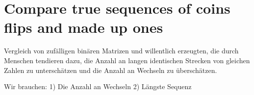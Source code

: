 
\renewenvironment{Schunk}{\vspace{10pt}}{\vspace{8pt}}   

\section{Compare true sequences of coins flips and made up ones}

Vergleich von zufälligen binären Matrizen und willentlich erzeugten, die durch 
Menschen tendieren dazu, die Anzahl an langen identischen Strecken von gleichen Zahlen zu unterschätzen und die Anzahl an Wechseln zu überschätzen. 
     
Wir brauchen:
1) Die Anzahl an Wechseln
2) Längste Sequenz 

